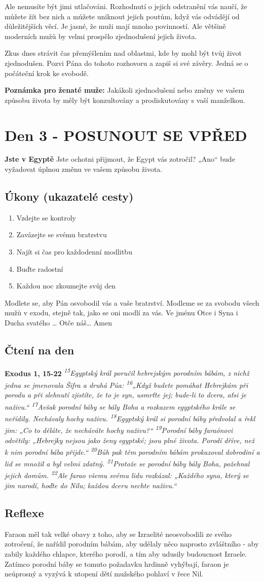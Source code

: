 \documentclass[11pt]{article}
\newcommand{\zacatekPrvniTyden}{
  \textbf{Jste v Egyptě} \newline
  Jste ochotni přijmout, že Egypt vás zotročil? „Ano“ bude vyžadovat úplnou změnu ve vašem způsobu života.

\subsection*{Úkony (ukazatelé cesty)}
\begin{enumerate}
  \item Vzdejte se kontroly
  \item Zavázejte se svému bratrstvu
  \item Najít si čas pro každodenní modlitbu
  \item Buďte radostní
  \item Každou noc zkoumejte svůj den
\end{enumerate}
Modlete se, aby Pán osvobodil vás a vaše bratrství. \newline
Modleme se za svobodu všech mužů v exodu, stejně tak, jako se oni modlí za vás.\newline
Ve jménu Otce i Syna i Ducha svatého …  Otče náš… Amen
}
\begin{document}
Ale nemusíte být jimi utlačováni. Rozhodnutí o jejich odstranění vás naučí, že můžete žít bez nich a můžete uniknout jejich poutům, když vás odvádějí od důležitějších věcí.
Je jasné, že muži mají mnoho povinností. Ale většině moderních mužů by velmi prospělo zjednodušení jejich života.

Zkus dnes strávit čas přemýšlením nad oblastmi, kde by mohl být tvůj život zjednodušen. Pozvi Pána do tohoto rozhovoru a zapiš si své závěry. Jedná se o počáteční krok ke svobodě.

\textbf{Poznámka pro ženaté muže:} Jakákoli zjednodušení nebo změny ve vašem způsobu života by měly být konzultovány a prodiskutovány s vaší manželkou.

\newpage
\section{Den 3 - POSUNOUT SE VPŘED}
\zacatekPrvniTyden
\subsection*{Čtení na den}
\textbf{Exodus 1, 15-22}
\newline
\textit{
\textsuperscript{15}Egyptský král poručil hebrejským porodním bábám, z nichž jedna se jmenovala Šifra a druhá Púa:
\textsuperscript{16}„Když budete pomáhat Hebrejkám při porodu a při slehnutí zjistíte, že to je syn, usmrťte jej; bude-li to dcera, aťsi je naživu.“
\textsuperscript{17}Avšak porodní báby se bály Boha a rozkazem egyptského krále se neřídily. Nechávaly hochy naživu.
\textsuperscript{18}Egyptský král si porodní báby předvolal a řekl jim: „Co to děláte, že necháváte hochy naživu?“
\textsuperscript{19}Porodní báby faraónovi odvětily: „Hebrejky nejsou jako ženy egyptské; jsou plné života. Porodí dříve, než k nim porodní bába přijde.“
\textsuperscript{20}Bůh pak těm porodním bábám prokazoval dobrodiní a lid se množil a byl velmi zdatný.
\textsuperscript{21}Protože se porodní báby bály Boha, požehnal jejich domům.
\textsuperscript{22}Ale farao všemu svému lidu rozkázal: „Každého syna, který se jim narodí, hoďte do Nilu; každou dceru nechte naživu.“
}

\subsection*{Reflexe}

Faraon měl tak velké obavy z toho, aby se Izraelité neosvobodili ze svého zotročení, že nařídil porodním bábám, aby udělaly něco naprosto zvláštního - aby zabily každého chlapce, kterého porodí, a tím aby udusily budoucnost Izraele. Zatímco porodní báby se tomuto požadavku hrdinně vyhýbají, faraon je neúprosný a vyzývá k utopení dětí mužského pohlaví v řece Nil.
\end{document}
